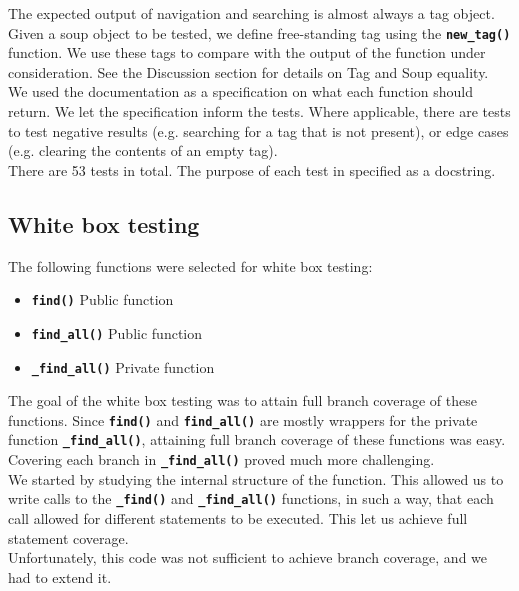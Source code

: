 \documentclass[10pt]{article}
\newcommand{\tbt}[1]{\texttt{\textbf{#1}}}
\begin{document}
The expected output of navigation and searching is almost always a tag object. Given a soup object to be tested, we define free-standing tag using the \tbt{new\_tag()} function. We use these tags to compare with the output of the function under consideration. See the Discussion section for details on Tag and Soup equality. \\

We used the documentation as a specification on what each function should return. We let the specification inform the tests. Where applicable, there are tests to test negative results (e.g. searching for a tag that is not present), or edge cases (e.g. clearing the contents of an empty tag). \\

There are 53 tests in total. The purpose of each test in specified as a docstring.


\subsection{White box testing}

The following functions were selected for white box testing:

\begin{itemize}
  \setlength\itemsep{-0.05em}
  \item \tbt{find()} \qquad Public function
  \item \tbt{find\_all()} \qquad Public function
  \item \tbt{\_find\_all()} \qquad Private function
\end{itemize}

The goal of the white box testing was to attain full branch coverage of these functions. Since \texttt{\textbf{find()}} and \texttt{\textbf{find\_all()}} are mostly wrappers for the private function \texttt{\textbf{\_find\_all()}}, attaining full branch coverage of these functions was easy. Covering each branch in \texttt{\textbf{\_find\_all()}} proved much more challenging. \\

We started by studying the internal structure of the function. This allowed us to write calls to the \tbt{\_find()} and \tbt{\_find\_all()} functions, in such a way, that each call allowed for different statements to be executed. This let us achieve full statement coverage. \\

Unfortunately, this code was not sufficient to achieve branch coverage, and we had to extend it.
\end{document}

